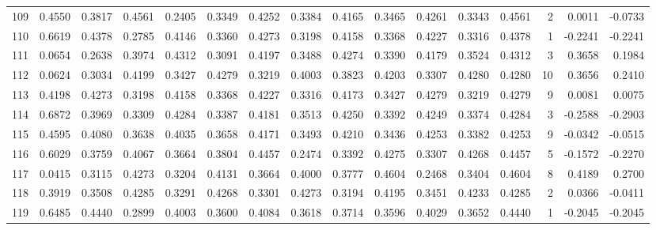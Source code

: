\begin{tabular}{lrrrrrrrrrrrrrrr}
109 &      0.4550 &  0.3817 &  0.4561 &  0.2405 &  0.3349 &  0.4252 &  0.3384 &  0.4165 &  0.3465 &  0.4261 &   0.3343 &     0.4561 &      2 &                    0.0011 &                    -0.0733 \\
110 &      0.6619 &  0.4378 &  0.2785 &  0.4146 &  0.3360 &  0.4273 &  0.3198 &  0.4158 &  0.3368 &  0.4227 &   0.3316 &     0.4378 &      1 &                   -0.2241 &                    -0.2241 \\
111 &      0.0654 &  0.2638 &  0.3974 &  0.4312 &  0.3091 &  0.4197 &  0.3488 &  0.4274 &  0.3390 &  0.4179 &   0.3524 &     0.4312 &      3 &                    0.3658 &                     0.1984 \\
112 &      0.0624 &  0.3034 &  0.4199 &  0.3427 &  0.4279 &  0.3219 &  0.4003 &  0.3823 &  0.4203 &  0.3307 &   0.4280 &     0.4280 &     10 &                    0.3656 &                     0.2410 \\
113 &      0.4198 &  0.4273 &  0.3198 &  0.4158 &  0.3368 &  0.4227 &  0.3316 &  0.4173 &  0.3427 &  0.4279 &   0.3219 &     0.4279 &      9 &                    0.0081 &                     0.0075 \\
114 &      0.6872 &  0.3969 &  0.3309 &  0.4284 &  0.3387 &  0.4181 &  0.3513 &  0.4250 &  0.3392 &  0.4249 &   0.3374 &     0.4284 &      3 &                   -0.2588 &                    -0.2903 \\
115 &      0.4595 &  0.4080 &  0.3638 &  0.4035 &  0.3658 &  0.4171 &  0.3493 &  0.4210 &  0.3436 &  0.4253 &   0.3382 &     0.4253 &      9 &                   -0.0342 &                    -0.0515 \\
116 &      0.6029 &  0.3759 &  0.4067 &  0.3664 &  0.3804 &  0.4457 &  0.2474 &  0.3392 &  0.4275 &  0.3307 &   0.4268 &     0.4457 &      5 &                   -0.1572 &                    -0.2270 \\
117 &      0.0415 &  0.3115 &  0.4273 &  0.3204 &  0.4131 &  0.3664 &  0.4000 &  0.3777 &  0.4604 &  0.2468 &   0.3404 &     0.4604 &      8 &                    0.4189 &                     0.2700 \\
118 &      0.3919 &  0.3508 &  0.4285 &  0.3291 &  0.4268 &  0.3301 &  0.4273 &  0.3194 &  0.4195 &  0.3451 &   0.4233 &     0.4285 &      2 &                    0.0366 &                    -0.0411 \\
119 &      0.6485 &  0.4440 &  0.2899 &  0.4003 &  0.3600 &  0.4084 &  0.3618 &  0.3714 &  0.3596 &  0.4029 &   0.3652 &     0.4440 &      1 &                   -0.2045 &                    -0.2045 \\

\end{tabular}
